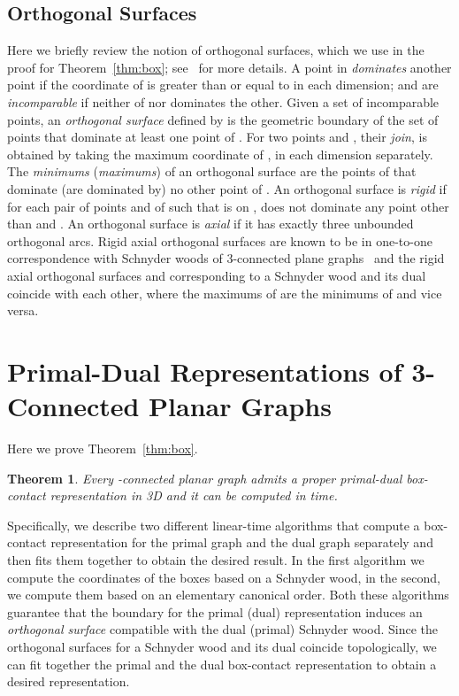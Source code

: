 \documentclass{article}
\newcounter{dummycount}
\newtheorem{theorem}{Theorem}
\newenvironment{backInTime}[1]
{
\setcounter{dummycount}{\value{theorem}}
\setcounter{theorem}{\value{#1}}
}
{
\setcounter{theorem}{\value{dummycount}}
}
\newcommand{\df}{\textit}
\begin{document}
\subsection{Orthogonal Surfaces}
\label{sec:ortho}

Here we briefly review the notion of orthogonal surfaces, which we use in the proof for
 Theorem~\ref{thm:box}; see~\cite{FZ08} for more details.
A point  in  \df{dominates} another point  if the coordinate of  is greater than or equal to
  in each dimension;  and  are \df{incomparable} if neither of  nor  dominates the other.
 Given a set  of incomparable points, an \df{orthogonal surface} defined by  is the geometric
 boundary of the set of points that dominate at least one point of .
For two points  and , their \df{join},  is obtained by taking the maximum coordinate of
 ,  in each dimension separately. The \df{minimums} (\df{maximums})
 of an orthogonal surface  are the points of  that dominate (are dominated by) no other
 point of . An orthogonal surface  is \df{rigid} if for each pair of points  and  of  such that
  is on ,  does not dominate any point other than  and .
 An orthogonal surface is \df{axial} if it has exactly three unbounded orthogonal arcs.
 Rigid axial orthogonal surfaces are known to be in one-to-one correspondence with Schnyder woods
 of 3-connected plane graphs~\cite{FZ08} and the rigid axial orthogonal surfaces  and 
 corresponding to a Schnyder wood and its dual coincide with each other, where the maximums of
  are the minimums of  and vice versa.


\section{Primal-Dual Representations of 3-Connected Planar Graphs}
\label{sec:pri-du}

Here we prove Theorem~\ref{thm:box}.


\begin{backInTime}{thm-box}
 \begin{theorem}
  Every -connected planar graph  admits a proper primal-dual box-contact representation in 3D and it can be computed in  time.
 \end{theorem}
\end{backInTime}


Specifically, we describe two different linear-time algorithms that compute
 a box-contact representation for the primal graph and the dual graph separately
 and then fits them together to obtain the desired result.
In the first algorithm we compute the coordinates of the boxes based on a Schnyder wood,
 in the second, we compute them based on an elementary canonical order. Both these algorithms
 guarantee that the boundary for the primal (dual) representation induces an \df{orthogonal surface}
 compatible with the dual (primal) Schnyder wood.
Since the orthogonal surfaces for a Schnyder wood and its dual coincide topologically, we can
fit together the primal and the dual box-contact representation to obtain a desired representation.
\end{document}
